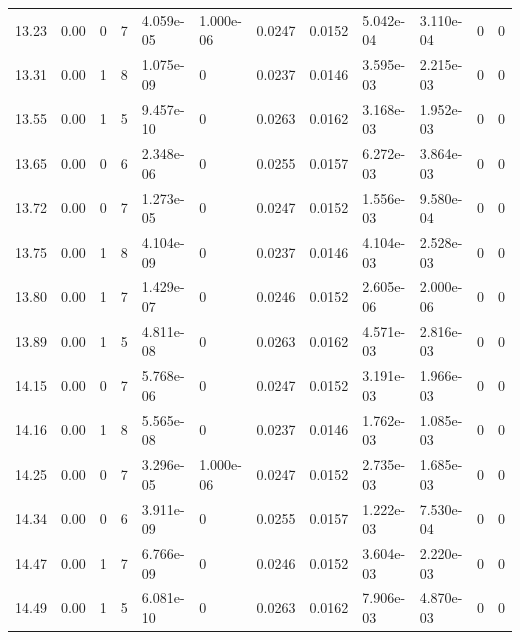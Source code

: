 \documentclass[preview]{standalone}
\begin{document}
{{{{{\begin{tabular}{L{1.2cm}C{1.2cm} C{0.3cm}C{0.5cm} C{1.4cm}C{1.4cm} C{1.4cm}C{1.4cm} C{1.6cm}C{1.6cm} C{1.6cm}C{1.6cm}}
  13.23  &  0.00  & 0     &  7 &  4.059e-05  & 1.000e-06  &  0.0247&   0.0152& 5.042e-04 & 3.110e-04   &  0 & 0  \\ 
  13.31  &  0.00  & 1     &  8 &  1.075e-09  & 0  &  0.0237&   0.0146& 3.595e-03 & 2.215e-03   &  0 & 0  \\ 
  13.55  &  0.00  & 1     &  5 &  9.457e-10  & 0  &  0.0263&   0.0162& 3.168e-03 & 1.952e-03   &  0 & 0  \\ 
  13.65  &  0.00  & 0     &  6 &  2.348e-06  & 0  &  0.0255&   0.0157& 6.272e-03 & 3.864e-03   &  0 & 0  \\ 
  13.72  &  0.00  & 0     &  7 &  1.273e-05  & 0  &  0.0247&   0.0152& 1.556e-03 & 9.580e-04   &  0 & 0  \\ 
  13.75  &  0.00  & 1     &  8 &  4.104e-09  & 0  &  0.0237&   0.0146& 4.104e-03 & 2.528e-03   &  0 & 0  \\ 
  13.80  &  0.00  & 1     &  7 &  1.429e-07  & 0  &  0.0246&   0.0152& 2.605e-06 & 2.000e-06   &  0 & 0  \\ 
  13.89  &  0.00  & 1     &  5 &  4.811e-08  & 0  &  0.0263&   0.0162& 4.571e-03 & 2.816e-03   &  0 & 0  \\ 
  14.15  &  0.00  & 0     &  7 &  5.768e-06  & 0  &  0.0247&   0.0152& 3.191e-03 & 1.966e-03   &  0 & 0  \\ 
  14.16  &  0.00  & 1     &  8 &  5.565e-08  & 0  &  0.0237&   0.0146& 1.762e-03 & 1.085e-03   &  0 & 0  \\ 
  14.25  &  0.00  & 0     &  7 &  3.296e-05  & 1.000e-06  &  0.0247&   0.0152& 2.735e-03 & 1.685e-03   &  0 & 0  \\ 
  14.34  &  0.00  & 0     &  6 &  3.911e-09  & 0  &  0.0255&   0.0157& 1.222e-03 & 7.530e-04   &  0 & 0  \\ 
  14.47  &  0.00  & 1     &  7 &  6.766e-09  & 0  &  0.0246&   0.0152& 3.604e-03 & 2.220e-03   &  0 & 0  \\ 
  14.49  &  0.00  & 1     &  5 &  6.081e-10  & 0  &  0.0263&   0.0162& 7.906e-03 & 4.870e-03   &  0 & 0  \\ 
\hline 
\end{tabular} 

}}}}}
\end{document}
